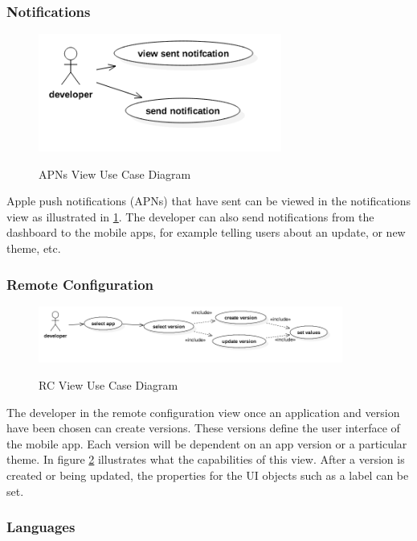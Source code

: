 \subsubsection{Notifications} \label{d-db:notifications}

\begin{figure}[!h] 
    \caption{APNs View Use Case Diagram}
    \centering
    \includegraphics[width=80mm]{images/use_cases/notifications_uc}
    \label{fig:notifications_uc}
\end{figure}

Apple push notifications (APNs) that have sent can be viewed in the notifications view as illustrated in \ref{fig:notifications_uc}. The developer can also send notifications from the dashboard to the mobile apps, for example telling users about an update, or new theme, etc. 

\subsubsection{Remote Configuration} \label{d-db:remote_config}

\begin{figure}[!h]
    \caption{RC View Use Case Diagram}
    \centering
    \includegraphics[width=100mm]{images/use_cases/rc_uc}
    \label{fig:rc_uc}
\end{figure}
 
The developer in the remote configuration view once an application and version have been chosen can create versions. These versions define the user interface of the mobile app. Each version will be dependent on an app version or a particular theme. In figure \ref{fig:rc_uc} illustrates what the capabilities of this view. After a version is created or being updated, the properties for the UI objects such as a label can be set.
 
\subsubsection{Languages} \label{d-db:languages}

